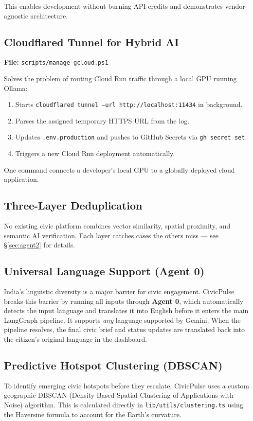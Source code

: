 \documentclass[11pt,a4paper]{article}
\newcommand{\tech}[1]{\texttt{\color{cpteal}#1}}
\newcommand{\file}[1]{\texttt{\footnotesize\color{cpgray}#1}}
\begin{document}
This enables development without burning API credits and demonstrates vendor-agnostic architecture.

\subsection{Cloudflared Tunnel for Hybrid AI}
\textbf{File:} \file{scripts/manage-gcloud.ps1}

Solves the problem of routing Cloud Run traffic through a local GPU running Ollama:
\begin{enumerate}
  \item Starts \tech{cloudflared tunnel --url http://localhost:11434} in background.
  \item Parses the assigned temporary HTTPS URL from the log.
  \item Updates \tech{.env.production} and pushes to GitHub Secrets via \tech{gh secret set}.
  \item Triggers a new Cloud Run deployment automatically.
\end{enumerate}
One command connects a developer's local GPU to a globally deployed cloud application.

\subsection{Three-Layer Deduplication}
No existing civic platform combines vector similarity, spatial proximity, and semantic AI verification. Each layer catches cases the others miss — see §\ref{sec:agent2} for details.

\subsection{Universal Language Support (Agent 0)}
India's linguistic diversity is a major barrier for civic engagement. CivicPulse breaks this barrier by running all inputs through \textbf{Agent 0}, which automatically detects the input language and translates it into English before it enters the main LangGraph pipeline. It supports \textit{any} language supported by Gemini. When the pipeline resolves, the final civic brief and status updates are translated back into the citizen's original language in the dashboard.

\subsection{Predictive Hotspot Clustering (DBSCAN)}
To identify emerging civic hotspots before they escalate, CivicPulse uses a custom geographic DBSCAN (Density-Based Spatial Clustering of Applications with Noise) algorithm. This is calculated directly in \file{lib/utils/clustering.ts} using the Haversine formula to account for the Earth's curvature.
\end{document}
